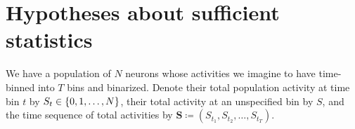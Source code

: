 \documentclass[\ifafour a4paper,12pt,\else a5paper,10pt,\fi%
onecolumn,oneside,article,%
british%
]{memoir}
\title{\propertitle}
\author{%
\hspace*{\stretch{1}}%
\parbox{0.5\linewidth}%
{\protect\centering P.G.L.  Porta Mana\\%
\footnotesize\epost{\email{piero.mana}{ntnu.no}}}%
\hspace*{\stretch{1}}%
}
\date{Draft of \today\ (first drafted \firstdraft)}
\theoremstyle{remark}
\theoremstyle{innote}
\newcommand*{\amp}{\&}
\newcommand*{\asudedication}[1]{%
{\par\centering\textit{#1}\par}}
\newcommand*{\defd}{\coloneqq}
\DeclarePairedDelimiter\set{\{}{\}}
\renewcommand*{\|}{\nonscript\,\vert\nonscript\;\mathopen{}}
\newcommand*{\yS}{S}
\newcommand*{\ySt}{\bm{\yS}}
\begin{document}
\captiondelim{\quad}\captionnamefont{\footnotesize}\captiontitlefont{\footnotesize}
\frenchspacing
\maketitle

\abstractrunin
\abslabeldelim{}
\renewcommand*{\abstractname}{}
\setlength{\absleftindent}{0pt}
\setlength{\absrightindent}{0pt}
\setlength{\abstitleskip}{-\absparindent}
\begin{abstract}%
  \noindent Assessing the probability of a hypothesis of sufficiency from
  the observation of a sample.

\end{abstract}
\frenchspacing





\section{Hypotheses about sufficient statistics}
\label{sec:hypotheses}



We have a population of $N$ neurons whose activities we imagine to have
time-binned into $T$ bins and binarized. Denote their total population
activity at time bin $t$ by $\yS_{t} \in \set{0,1,\dotsc,N}$, their total
activity at an unspecified bin by $\yS$, and the time sequence of total
activities by $\ySt\defd ( \yS_{t_1}, \yS_{t_2}, \dotsc, \yS_{t_T} )$.
\end{document}
